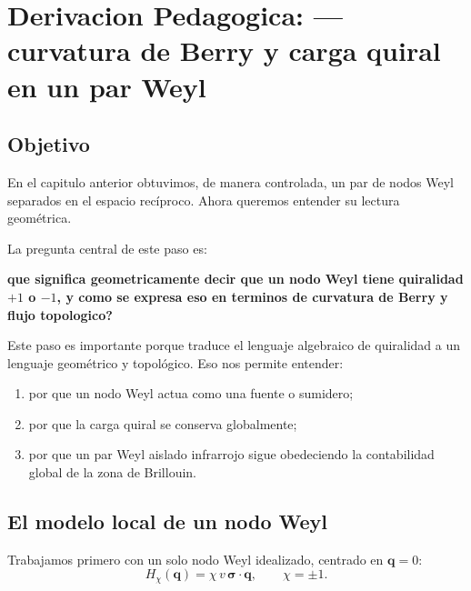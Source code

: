 \chapter{Derivacion Pedagogica: --- curvatura de Berry y carga quiral en un par Weyl}
\label{ch:berry-carga-quiral-weyl}







\section{Objetivo}
En el capitulo anterior obtuvimos, de manera controlada, un par de nodos Weyl separados en el espacio recíproco. Ahora queremos entender su lectura geométrica.

La pregunta central de este paso es:
\begin{displayquote}
\textbf{que significa geometricamente decir que un nodo Weyl tiene quiralidad \(+1\) o \(-1\), y como se expresa eso en terminos de curvatura de Berry y flujo topologico?}
\end{displayquote}

Este paso es importante porque traduce el lenguaje algebraico de quiralidad a un lenguaje geométrico y topológico. Eso nos permite entender:
\begin{enumerate}[label=\arabic*.]
    \item por que un nodo Weyl actua como una fuente o sumidero;
    \item por que la carga quiral se conserva globalmente;
    \item por que un par Weyl aislado infrarrojo sigue obedeciendo la contabilidad global de la zona de Brillouin.
\end{enumerate}

\section{El modelo local de un nodo Weyl}
Trabajamos primero con un solo nodo Weyl idealizado, centrado en \(\bm{q}=0\):
\begin{equation}
H_\chi(\bm{q})=
\chi\, v\, \bm{\sigma}\cdot \bm{q},
\qquad
\chi=\pm 1.
\label{c10:eq:weyl}
\end{equation}

